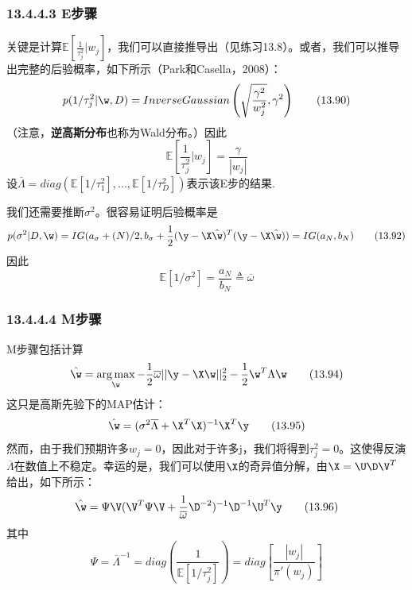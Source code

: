 \documentclass[a4paper]{article}
\DeclareMathOperator*{\argmax}{arg\,max}
\begin{document}
\subsubsection*{13.4.4.3 E步骤}
关键是计算$\mathbb{E}\left[\frac{1}{\tau_j^2}|w_j\right]$，我们可以直接推导出（见练习13.8）。或者，我们可以推导出完整的后验概率，如下所示（Park和Casella，2008）：
\begin{equation}
	p(1/\tau_j^2|\w,D)=InverseGaussian\left(\sqrt{\frac{\gamma^2}{w_j^2}},\gamma^2\right)\tag{13.90}
\end{equation}
（注意，\textbf{逆高斯分布}也称为Wald分布。）因此
\begin{equation}
	\mathbb{E}\left[\frac{1}{\tau_j^2}|w_j\right]=\frac{\gamma}{|w_j|}\tag{13.91}
\end{equation}
设$\overline{\Lambda}=diag(\mathbb{E}[1/\tau_1^2],...,\mathbb{E}[1/\tau_D^2])$表示该E步的结果.

我们还需要推断$\sigma^2$。很容易证明后验概率是
\begin{equation}
	p(\sigma^2|D,\w)=IG(a_\sigma+(N)/2,b_\sigma+\frac{1}{2}(\y-\X\hat{\w})^T(\y-\X\hat{\w}))=IG(a_N,b_N)\tag{13.92}
\end{equation}
因此
\begin{equation}
	\mathbb{E}[1/\sigma^2]=\frac{a_N}{b_N}\triangleq \overline{\omega}\tag{13.93}
\end{equation}

\subsubsection*{13.4.4.4  M步骤}
M步骤包括计算
\begin{equation}
	\hat{\w}=\argmax_\w-\frac{1}{2}\overline{\omega}||\y-\X\w||_2^2-\frac{1}{2}\w^T\Lambda\w\tag{13.94}
\end{equation}
这只是高斯先验下的MAP估计：
\begin{equation}
	\hat{\w}=(\sigma^2\overline{\Lambda}+\X^T\X)^{-1}\X^T\y\tag{13.95}
\end{equation}
然而，由于我们预期许多$w_j=0$，因此对于许多j，我们将得到$\tau_j^2=0$。这使得反演$\overline{\Lambda}$在数值上不稳定。幸运的是，我们可以使用$\X$的奇异值分解，由$\X=\U\D\V^T$给出，如下所示：
\begin{equation}
	\hat{\w}=\Psi\V(\V^T\Psi\V+\frac{1}{\overline{\omega}}\D^{-2})^{-1}\D^{-1}\U^T\y\tag{13.96}
\end{equation}
其中
\begin{equation}
	\Psi=\overline{\Lambda}^{-1}=diag(\dfrac{1}{\mathbb{E}[1/\tau_j^2]})=diag[\dfrac{|w_j|}{\pi'(w_j)}]\tag{13.97}
\end{equation}
\end{document}
